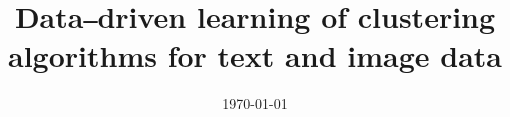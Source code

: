 \documentclass[a4paper, 11pt, oneside]{Thesis}  %
\begin{document}
\frontmatter      %

\title  {Data‒driven learning of clustering algorithms for text and image data}
\addresses  {\groupname\\\deptname\\\univname}  %
\date       {\today}
\subject    {}
\keywords   {}



\fancyhead{}  %
\rhead{\thepage}  %
\lhead{}  %

\pagestyle{fancy}  %




 
 
\end{document}
